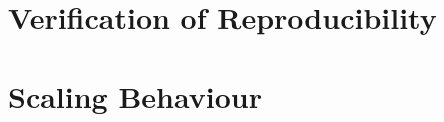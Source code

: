 \section{Verification of Reproducibility}
\label{sec:VerificationOfReproducibility}

\section{Scaling Behaviour}
\label{sec:ScalingBehaviour}
